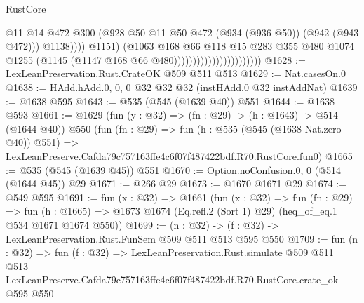 \begin{lexlean}{RustCore}
\begin{coremodule}
                                                      @11
                                                      @14
                                                      @472
                                                      @300
                                                      (@928
                                                        @50
                                                        @11
                                                        @50
                                                        @472
                                                        (@934 (@936 @50))
                                                        (@942 (@943 @472)))
                                                      @1138))))
                                              @1151)
                                            (@1063
                                              @168
                                              @66
                                              @118
                                              @15
                                              @283
                                              @355
                                              @480
                                              @1074
                                              @1255
                                              (@1145 (@1147 @168 @66 @480)))))))))))))))))))))))
@1628 := LexLeanPreservation.Rust.CrateOK @509 @511 @513
@1629 := Nat.casesOn.{0}
@1638 := HAdd.hAdd.{0, 0, 0} @32 @32 @32 (instHAdd.{0} @32 instAddNat)
@1639 := @1638 @595
@1643 := @535 (@545 (@1639 @40)) @551
@1644 := @1638 @593
@1661 := @1629
    (fun (y : @32) => (fn : @29) -> (h : @1643) -> @514 (@1644 @40))
    @550
    (fun (fn : @29) =>
    fun (h : @535 (@545 (@1638 Nat.zero @40)) @551) =>
    LexLeanPreserve.Cafda79c757163ffe4c6f07f487422bdf.R70.RustCore.fun0)
@1665 := @535 (@545 (@1639 @45)) @551
@1670 := Option.noConfusion.{0, 0} (@514 (@1644 @45)) @29
@1671 := @266 @29
@1673 := @1670 @1671 @29
@1674 := @549 @595
@1691 := fun (x : @32) =>
  @1661
    (fun (x : @32) =>
    fun (fn : @29) =>
    fun (h : @1665) => @1673 @1674 (Eq.refl.{2} (Sort 1) @29) (heq_of_eq.{1} @534 @1671 @1674 @550))
@1699 := (n : @32) -> (f : @32) -> LexLeanPreservation.Rust.FunSem @509 @511 @513 @595 @550
@1709 := fun (n : @32) =>
  fun (f : @32) =>
  LexLeanPreservation.Rust.simulate
    @509
    @511
    @513
    LexLeanPreserve.Cafda79c757163ffe4c6f07f487422bdf.R70.RustCore.crate_ok
    @595
    @550
\end{coremodule}
\end{lexlean}
